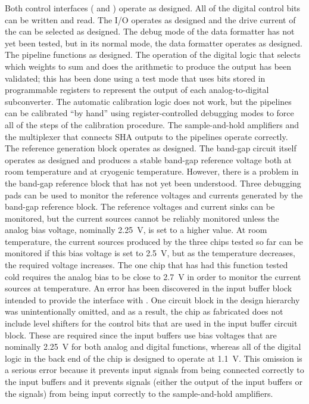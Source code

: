 Both control interfaces ( and ) operate as designed.  All of the digital control
bits can be written and read.  The  I/O operates as designed and the drive current of the
 can be selected as designed.  The debug mode of the data formatter has not yet been tested,
but in its normal mode, the data formatter operates as designed.  The  pipeline functions as
designed.  The operation of the digital logic that selects which weights to sum and does the arithmetic
to produce the  output has been validated; this has been done using a test mode that uses bits
stored in programmable registers to represent the output of each analog-to-digital subconverter.  The automatic
calibration logic does not work, but the pipelines can be calibrated ``by hand'' using register-controlled
debugging modes to force all of the steps of the calibration procedure.  The sample-and-hold amplifiers and the
multiplexer that connects SHA outputs to the  pipelines operate correctly.  The 
reference generation block operates as designed.  The band-gap circuit itself operates as designed and produces
a stable band-gap reference voltage both at room temperature and at cryogenic temperature.  However, there is a
problem in the band-gap reference block that has not yet been understood.  Three debugging pads can be used to
monitor the reference voltages and currents generated by the band-gap reference block.  The reference voltages
and current sinks can be monitored, but the current sources cannot be reliably monitored unless the analog bias
voltage, nominally \SI{2.25}{V}, is set to a higher value.  At room temperature, the current sources produced
by the three chips tested so far can be monitored if this bias voltage is set to \SI{2.5}{V}, but as the
temperature decreases, the required voltage increases.  The one chip that has had this function tested cold
requires the analog bias to be close to \SI{2.7}{V} in order to monitor the current sources at \lntwo
temperature.  An error has been discovered in the input buffer block intended to provide the interface with
.  One circuit block in the design hierarchy was unintentionally omitted, and as a result, the
chip as fabricated does not include level shifters for the control bits that are used in the input buffer
circuit block.  These are required since the input buffers use bias voltages that are nominally \SI{2.25}{V}
for both analog and digital functions, whereas all of the digital logic in the back end of the chip is designed
to operate at \SI{1.1}{V}.  This omission is a serious error because it prevents input signals from being
connected correctly to the input buffers and it prevents signals (either the output of the input buffers or
the  signals) from being input correctly to the sample-and-hold amplifiers.

